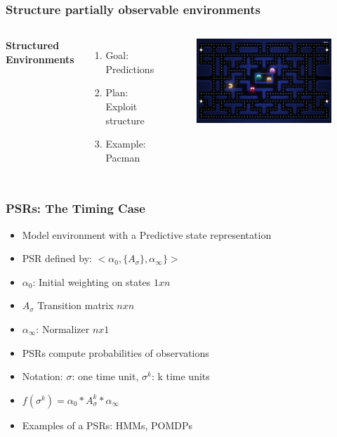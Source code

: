 \documentclass{beamer}
\begin{document}
\begin{frame}
\frametitle{Structure partially observable environments}
\begin{columns}[c] %

\textbf{Structured Environments}
\begin{enumerate}
\item Goal: Predictions
\item Plan: Exploit structure
\item Example: Pacman

\end{enumerate}

\begin{figure}
\includegraphics[width=1.0\linewidth]{lucasplots/pac-man.jpg}
\end{figure}

\end{columns}
\end{frame}


\begin{frame}
\frametitle{PSRs: The Timing Case}

\begin{itemize}
\item Model environment with a Predictive state representation
\item PSR defined by: $<\alpha_0, \{A_\sigma\},\alpha_\infty\}>$
\item[] $\alpha_0$: Initial weighting on states $1xn$
\item[] $A_\sigma$ Transition matrix $nxn$
\item[] $\alpha_\infty$: Normalizer $nx1$

\item PSRs compute probabilities of observations
\item[] Notation: $\sigma$: one time unit, $\sigma^k$: k time units
\item[] $f(\sigma^k) = \alpha_0*A_\sigma^k*\alpha_\infty$
\item Examples of a PSRs: HMMs, POMDPs
 
\end{itemize}

\end{frame}
\end{document}
